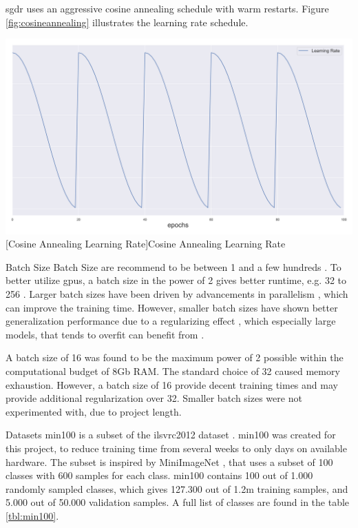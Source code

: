 \begin{enumdescript}
\begin{enumdescript}
		\gls{sgdr} uses an aggressive cosine annealing schedule with warm restarts. Figure \ref{fig:cosineannealing} illustrates the learning rate schedule.
		
		\begin{minipage}[t]{\linewidth}
			\centering
			\includegraphics[width=.7\linewidth]{figures/lr.png}
			[Cosine Annealing Learning Rate]{Cosine Annealing Learning Rate} 
			\label{fig:cosineannealing}
		\end{minipage}
		
		\item[Batch Size] Batch Size are recommend to be between 1 and a few hundreds \cite{bengio_practical_2012}. To better utilize \gls{gpu}s, a batch size in the power of 2 gives better runtime, e.g. 32 to 256 \cite{goodfellow_deep_2016}. Larger batch sizes have been driven by advancements in parallelism \cite{dean_large_2012}, which can improve the training time. However, smaller batch sizes have shown better generalization performance due to a regularizing effect \cite{masters_revisiting_nodate}, which especially large models, that tends to overfit can benefit from \cite{goodfellow_deep_2016}. 
		
		A batch size of 16 was found to be the maximum power of 2 possible within the computational budget of 8Gb RAM. The standard choice of 32 caused memory exhaustion. However, a batch size of 16 provide decent training times and may provide additional regularization over 32. Smaller batch sizes were not experimented with, due to project length.
		
		\item[Datasets] \gls{min100} is a subset of the \gls{ilsvrc2012} dataset \cite{russakovsky_imagenet_2015}. \gls{min100} was created for this project, to reduce training time from several weeks to only days on available hardware. The subset is inspired by MiniImageNet \cite{vinyals_matching_2016}, that uses a subset of 100 classes with 600 samples for each class. \gls{min100} contains 100 out of 1.000 randomly sampled classes, which gives 127.300 out of 1.2m training samples, and 5.000 out of 50.000 validation samples. A full list of classes are found in the table \ref{tbl:min100}. 
		

\end{enumdescript}
\end{enumdescript}
